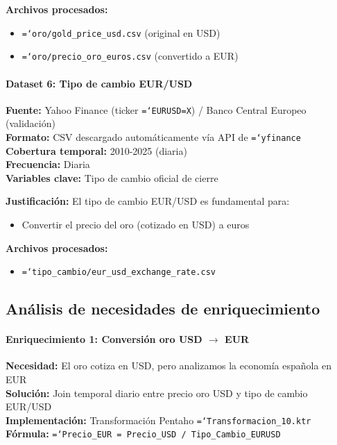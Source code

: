 \documentclass{article}
\let\oldtexttt\texttt  %
\renewcommand{\texttt}[1]{{\footnotesize\oldtexttt{\hyphenchar\font=`\-#1}}}  %
\begin{document}
\textbf{Archivos procesados:}
\begin{itemize}
    \item \texttt{oro/gold\_price\_usd.csv} (original en USD)
    \item \texttt{oro/precio\_oro\_euros.csv} (convertido a EUR)
\end{itemize}

\paragraph{Dataset 6: Tipo de cambio EUR/USD}

\textbf{Fuente:} Yahoo Finance (ticker \texttt{EURUSD=X}) / Banco Central Europeo (validaci\'on)\\
\textbf{Formato:} CSV descargado autom\'aticamente v\'ia API de \texttt{yfinance}\\
\textbf{Cobertura temporal:} 2010-2025 (diaria)\\
\textbf{Frecuencia:} Diaria\\
\textbf{Variables clave:} Tipo de cambio oficial de cierre

\textbf{Justificaci\'on:} El tipo de cambio EUR/USD es fundamental para:
\begin{itemize}
    \item Convertir el precio del oro (cotizado en USD) a euros
\end{itemize}

\textbf{Archivos procesados:}
\begin{itemize}
    \item \texttt{tipo\_cambio/eur\_usd\_exchange\_rate.csv}
\end{itemize}


\subsection{An\'alisis de necesidades de enriquecimiento}

\paragraph{Enriquecimiento 1: Conversi\'on oro USD $\rightarrow$ EUR}
\textbf{Necesidad:} El oro cotiza en USD, pero analizamos la econom\'ia espa\~nola en EUR\\
\textbf{Soluci\'on:} Join temporal diario entre precio oro USD y tipo de cambio EUR/USD\\
\textbf{Implementaci\'on:} Transformaci\'on Pentaho \texttt{Transformacion\_10.ktr}\\
\textbf{F\'ormula:} \texttt{Precio\_EUR = Precio\_USD / Tipo\_Cambio\_EURUSD}
\end{document}
